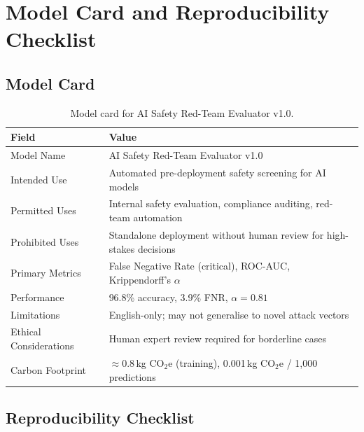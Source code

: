 \documentclass[10pt,letterpaper]{article}
\begin{document}
\section{Model Card and Reproducibility Checklist}
\label{app:modelcard}

\subsection*{Model Card}

\begin{table}[ht]
\centering
\caption{Model card for AI Safety Red-Team Evaluator v1.0.}
\label{tab:modelcard}
\begin{tabular}{lp{9cm}}
\toprule
Field & Value \\
\midrule
Model Name & AI Safety Red-Team Evaluator v1.0 \\
Intended Use & Automated pre-deployment safety screening for AI models \\
Permitted Uses & Internal safety evaluation, compliance auditing, red-team automation \\
Prohibited Uses & Standalone deployment without human review for high-stakes decisions \\
Primary Metrics & False Negative Rate (critical), ROC-AUC, Krippendorff's $\alpha$ \\
Performance & 96.8\% accuracy, 3.9\% FNR, $\alpha = 0.81$ \\
Limitations & English-only; may not generalise to novel attack vectors \\
Ethical Considerations & Human expert review required for borderline cases \\
Carbon Footprint & $\approx$0.8\,kg CO$_2$e (training), 0.001\,kg CO$_2$e / 1,000 predictions \\
\bottomrule
\end{tabular}
\end{table}

\subsection*{Reproducibility Checklist}
\end{document}
